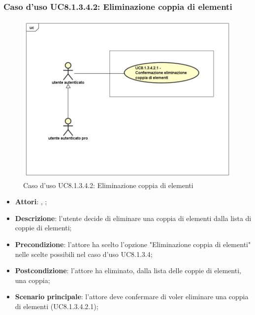 	\subsubsection{Caso d'uso UC8.1.3.4.2: Eliminazione coppia di elementi}
	\label{UC8.1.3.4.2}
	\begin{figure}[h]
		\centering
		\includegraphics[scale=0.5,keepaspectratio]{UML/UC8_1_3_4_2.png}
		\caption{Caso d'uso UC8.1.3.4.2: Eliminazione coppia di elementi}
	\end{figure}
	\FloatBarrier
	\begin{itemize}
		\item \textbf{Attori}: \uau, \uaupro;
		\item \textbf{Descrizione}: l'utente decide di eliminare una coppia di elementi dalla lista di coppie di elementi;
		\item \textbf{Precondizione}: l'attore ha scelto l'opzione "Eliminazione coppia di elementi" nelle scelte possibili nel caso d'uso UC8.1.3.4;
		\item \textbf{Postcondizione}: l'attore ha eliminato, dalla lista delle coppie di elementi, una coppia;
		\item \textbf{Scenario principale}: l'attore deve confermare di voler eliminare una coppia di elementi (UC8.1.3.4.2.1); 
	\end{itemize}

